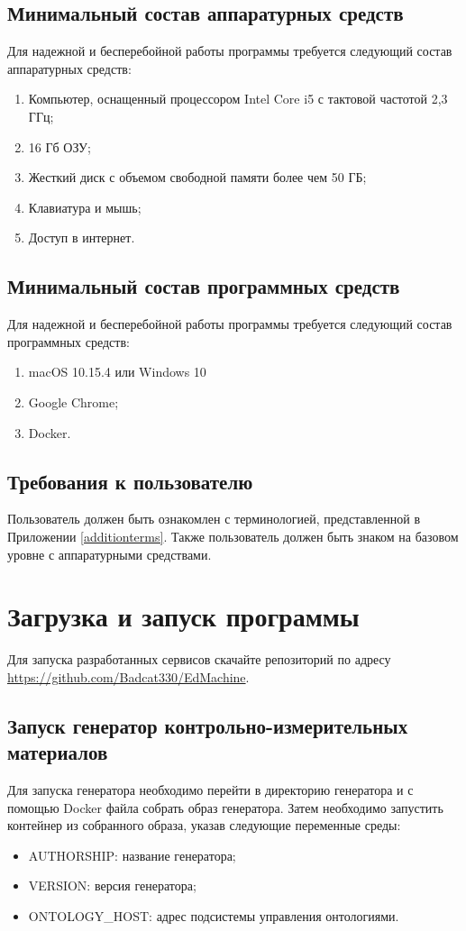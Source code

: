 \documentclass[a4paper,12pt,reqno]{article}
\begin{document}
    \subsection{Минимальный состав аппаратурных средств}
    Для надежной и бесперебойной работы программы требуется следующий состав аппаратурных средств:
    \begin{enumerate}
        \item Компьютер, оснащенный процессором Intel Core i5 с тактовой частотой 2,3 ГГц;
        \item 16 Гб ОЗУ;
        \item Жесткий диск с объемом свободной памяти более чем 50 ГБ;
        \item Клавиатура и мышь;
        \item Доступ в интернет.
    \end{enumerate}

    \subsection{Минимальный состав программных средств}
    Для надежной и бесперебойной работы программы требуется следующий состав программных средств:
    \begin{enumerate}
        \item macOS 10.15.4 или Windows 10
        \item Google Chrome;
        \item Docker.
    \end{enumerate}

    \subsection{Требования к пользователю}
    Пользователь должен быть ознакомлен с терминологией, представленной в Приложении \ref{additionterms}. Также пользователь должен быть знаком на базовом уровне с аппаратурными средствами.

    \newpage


    \section{Загрузка и запуск программы}
    Для запуска разработанных сервисов скачайте репозиторий по адресу \url{https://github.com/Badcat330/EdMachine}.

    \subsection{Запуск генератор контрольно-измерительных материалов}
    Для запуска генератора необходимо перейти в директорию генератора и с помощью Docker файла собрать образ генератора. Затем необходимо запустить контейнер из собранного образа, указав следующие переменные среды:
    \begin{itemize}
        \item AUTHORSHIP: название генератора;
        \item VERSION: версия генератора;
        \item ONTOLOGY\_HOST: адрес подсистемы управления онтологиями.
    \end{itemize}
\end{document}
